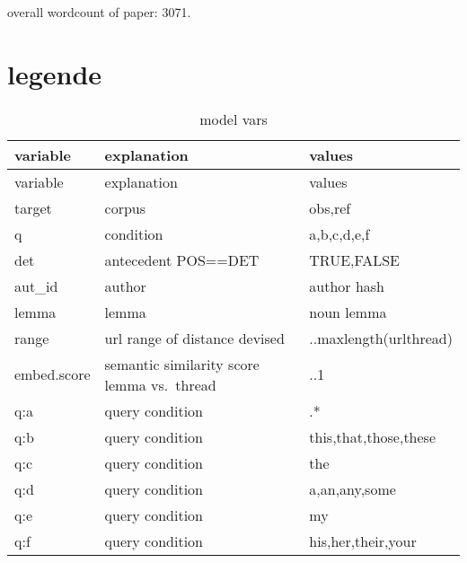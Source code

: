 \documentclass[
  12pt,
  oneside]{book}
\begin{document}
overall wordcount of paper: 3071.

\section{legende}\label{legende}

\begin{longtable}[]{@{}
  >{\raggedright\arraybackslash}p{}
  >{\raggedright\arraybackslash}p{}
  >{\raggedright\arraybackslash}p{}@{}}
\caption{\label{tab:legend}model vars}\tabularnewline
\toprule\noalign{}
\begin{minipage}[b]{\linewidth}\raggedright
variable
\end{minipage} & \begin{minipage}[b]{\linewidth}\raggedright
explanation
\end{minipage} & \begin{minipage}[b]{\linewidth}\raggedright
values
\end{minipage} \\
\midrule\noalign{}
\endfirsthead
\toprule\noalign{}
\begin{minipage}[b]{\linewidth}\raggedright
variable
\end{minipage} & \begin{minipage}[b]{\linewidth}\raggedright
explanation
\end{minipage} & \begin{minipage}[b]{\linewidth}\raggedright
values
\end{minipage} \\
\midrule\noalign{}
\endhead
\bottomrule\noalign{}
\endlastfoot
target & corpus & obs,ref \\
q & condition & a,b,c,d,e,f \\
det & antecedent POS==DET & TRUE,FALSE \\
aut\_id & author & author hash \\
lemma & lemma & noun lemma \\
range & url range of distance devised & 1..maxlength(urlthread) \\
embed.score & semantic similarity score lemma vs.~thread & 0..1 \\
q:a & query condition & .* \\
q:b & query condition & this,that,those,these \\
q:c & query condition & the \\
q:d & query condition & a,an,any,some \\
q:e & query condition & my \\
q:f & query condition & his,her,their,your \\
\end{longtable}
\end{document}
